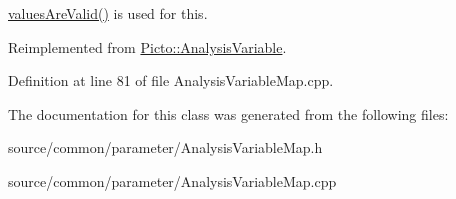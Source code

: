 \hyperlink{class_picto_1_1_parameter_a3443808da4c3edf26f2c3c3772d95b10}{values\-Are\-Valid()} is used for this. 

Reimplemented from \hyperlink{class_picto_1_1_analysis_variable_a4279b4c9eca4a7ef60de8e4db91dc6f3}{Picto\-::\-Analysis\-Variable}.



Definition at line 81 of file Analysis\-Variable\-Map.\-cpp.



The documentation for this class was generated from the following files\-:\begin{DoxyCompactItemize}
\item 
source/common/parameter/Analysis\-Variable\-Map.\-h\item 
source/common/parameter/Analysis\-Variable\-Map.\-cpp\end{DoxyCompactItemize}
